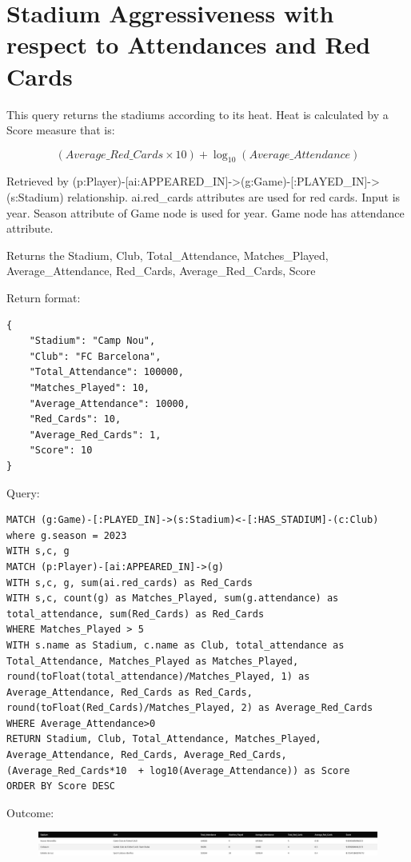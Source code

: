 \documentclass{Configuration_Files/PoliMi3i_thesis}
\begin{document}
\section{Stadium Aggressiveness with respect to Attendances and Red Cards}
This query returns the stadiums according to its heat. Heat is calculated by a Score measure that is:

\[
(Average\_Red\_Cards \times 10) + \log_{10}(Average\_Attendance)
\]

Retrieved by (p:Player)-[ai:APPEARED\_IN]->(g:Game)-[:PLAYED\_IN]->(s:Stadium) relationship.
ai.red\_cards attributes are used for red cards.
Input is year. Season attribute of Game node is used for year.
Game node has attendance attribute.

Returns the 
Stadium, 
Club,
Total\_Attendance,
Matches\_Played,
Average\_Attendance,
Red\_Cards,
Average\_Red\_Cards,
Score

Return format:
\begin{lstlisting}[style=json]
{
    "Stadium": "Camp Nou",
    "Club": "FC Barcelona",
    "Total_Attendance": 100000,
    "Matches_Played": 10,
    "Average_Attendance": 10000,
    "Red_Cards": 10,
    "Average_Red_Cards": 1,
    "Score": 10
}
\end{lstlisting}


Query:

\begin{lstlisting}[language=Cypher]
MATCH (g:Game)-[:PLAYED_IN]->(s:Stadium)<-[:HAS_STADIUM]-(c:Club)
where g.season = 2023
WITH s,c, g
MATCH (p:Player)-[ai:APPEARED_IN]->(g)
WITH s,c, g, sum(ai.red_cards) as Red_Cards
WITH s,c, count(g) as Matches_Played, sum(g.attendance) as total_attendance, sum(Red_Cards) as Red_Cards
WHERE Matches_Played > 5
WITH s.name as Stadium, c.name as Club, total_attendance as Total_Attendance, Matches_Played as Matches_Played, round(toFloat(total_attendance)/Matches_Played, 1) as Average_Attendance, Red_Cards as Red_Cards, round(toFloat(Red_Cards)/Matches_Played, 2) as Average_Red_Cards
WHERE Average_Attendance>0
RETURN Stadium, Club, Total_Attendance, Matches_Played, Average_Attendance, Red_Cards, Average_Red_Cards,
(Average_Red_Cards*10  + log10(Average_Attendance)) as Score
ORDER BY Score DESC
\end{lstlisting}


Outcome:
\begin{figure}[H]
    \centering
    \includegraphics[width=\linewidth]{Project Template/Images/query_output/q14.png}
\end{figure}
\end{document}

